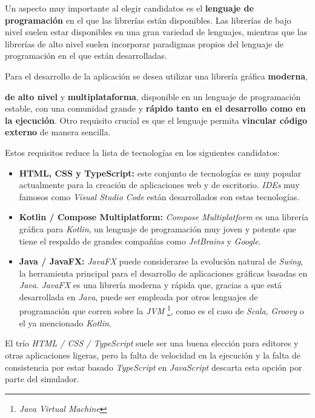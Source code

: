 \noindent Un aspecto muy importante al elegir candidatos es el \textbf{lenguaje de programación}
en el que las librerías están disponibles.
Las librerías de bajo nivel suelen estar disponibles en una gran variedad de lenguajes, mientras que las
librerías de alto nivel suelen incorporar paradigmas propios del lenguaje de programación en el que están
desarrolladas.

\noindent Para el desarrollo de la aplicación se desea utilizar una librería gráfica \textbf{moderna},

\textbf{de alto nivel} y \textbf{multiplataforma}, disponible en un lenguaje de programación estable,
con una comunidad grande y \textbf{rápido tanto en el desarrollo como en la ejecución}.
Otro requisito crucial es que el lenguaje permita \textbf{vincular código externo} de manera
sencilla.

\noindent Estos requisitos reduce la lista de tecnologías en los siguientes candidatos:
\begin{itemize}
    \item \textbf{HTML, CSS y TypeScript:} este conjunto de tecnologías es muy popular actualmente
    para la creación de aplicaciones web y de escritorio. \textit{IDEs} muy famosos como
    \textit{Visual Studio Code} están desarrollados con estas tecnologías.
    \item \textbf{Kotlin / Compose Multiplatform:} \textit{Compose Multiplatform} es una librería gráfica
    para \textit{Kotlin}, un lenguaje de programación muy joven y potente que tiene el respaldo de
    grandes compañías como \textit{JetBrains} y \textit{Google}.
    \item \textbf{Java / JavaFX:} \textit{JavaFX} puede considerarse la evolución natural de \textit{Swing},
    la herramienta principal para el desarrollo de aplicaciones gráficas basadas en \textit{Java}.
    \textit{JavaFX} es una librería moderna y rápida que, gracias a que está desarrollada en \textit{Java},
    puede ser empleada por otros lenguajes de programación que corren sobre la \textit{JVM}
    \footnote{\textit{Java Virtual Machine}}, como es el caso de \textit{Scala}, \textit{Groovy} o el ya mencionado
    \textit{Kotlin}.
\end{itemize}

\noindent El trío \textit{HTML / CSS / TypeScript} suele ser una buena elección para editores y otras
aplicaciones ligeras, pero la falta de velocidad en la ejecución y la falta de consistencia por estar
basado \textit{TypeScript} en \textit{JavaScript} descarta esta opción por parte del simulador.

